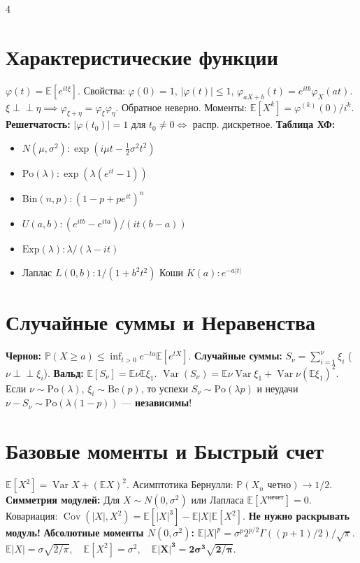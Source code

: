 \documentclass[8pt, a4paper, landscape]{extarticle}
\newcommand{\E}{\mathbb{E}}
\renewcommand{\P}{\mathbb{P}}
\DeclareMathOperator{\Var}{Var}
\DeclareMathOperator{\Cov}{Cov}
\begin{document}
\begin{multicols*}{4}
\section*{Характеристические функции}
$\varphi(t) = \E[e^{it\xi}]$. Свойства: $\varphi(0)=1$, $|\varphi(t)| \le 1$, $\varphi_{aX+b}(t) = e^{itb}\varphi_X(at)$.
$\xi \perp\!\!\perp \eta \implies \varphi_{\xi+\eta} = \varphi_\xi \varphi_\eta$. Обратное неверно. Моменты: $\E[X^k] = \varphi^{(k)}(0) / i^k$.
\textbf{Решетчатость:} $|\varphi(t_0)|=1$ для $t_0 \ne 0 \iff$ распр. дискретное.
\textbf{Таблица ХФ:}
\begin{itemize}
    \item $N(\mu,\sigma^2): \exp(i\mu t - \frac{1}{2}\sigma^2 t^2)$
    \item $\text{Po}(\lambda): \exp(\lambda(e^{it}-1))$
    \item $\text{Bin}(n,p): (1-p+pe^{it})^n$
    \item $U(a,b): (e^{itb}-e^{ita}) / (it(b-a))$
    \item $\text{Exp}(\lambda): \lambda / (\lambda-it)$
    \item Лаплас $L(0,b): 1 / (1+b^2 t^2)$ \quad Коши $K(a): e^{-a|t|}$
\end{itemize}

\section*{Случайные суммы и Неравенства}
\textbf{Чернов:} $\P(X \ge a) \le \inf_{t>0} e^{-ta}\E[e^{tX}]$.
\textbf{Случайные суммы:} $S_\nu = \sum_{i=1}^\nu \xi_i$ ($\nu \perp\!\!\perp \xi_i$).
\textbf{Вальд:} $\E[S_\nu] \!=\! \E\nu\E\xi_1$. $\Var(S_\nu) \!=\! \E\nu\Var\xi_1 \!+\! \Var\nu(\E\xi_1)^2$.
Если $\nu \sim \text{Po}(\lambda)$, $\xi_i \sim \text{Be}(p)$, то успехи $S_\nu \sim \text{Po}(\lambda p)$ и неудачи $\nu-S_\nu \sim \text{Po}(\lambda(1-p))$ --- \textbf{независимы}!

\section*{Базовые моменты и Быстрый счет}
$\E[X^2] = \Var X + (\E X)^2$. Асимптотика Бернулли: $\P(X_n \text{ четно}) \to 1/2$.
\textbf{Симметрия модулей:} Для $X \sim N(0, \sigma^2)$ или Лапласа $\E[X^{\text{нечет}}]=0$. Ковариация: $\Cov(|X|, X^2) = \E[|X|^3] - \E|X|\E[X^2]$. \textbf{Не нужно раскрывать модуль!}
\textbf{Абсолютные моменты $N(0, \sigma^2)$:}
$\E|X|^p = \sigma^p 2^{p/2} \Gamma((p+1)/2)/\sqrt{\pi}$.
$\E|X| = \sigma \sqrt{2/\pi}, \quad \E[X^2]=\sigma^2, \quad \mathbf{\E|X|^3 = 2\sigma^3 \sqrt{2/\pi}}$.


\end{multicols*}
\end{document}
